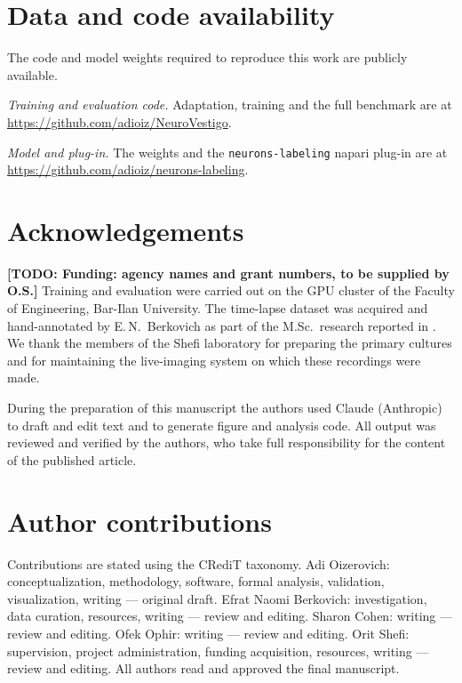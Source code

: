 \documentclass[11pt,a4paper]{article}
\newcommand{\todo}[1]{\textcolor{red!80!black}{\textbf{[TODO: #1]}}}
\begin{document}
\section*{Data and code availability}

The code and model weights required to reproduce this work are publicly
available.

\emph{Training and evaluation code.} Adaptation, training and the full benchmark are at
\url{https://github.com/adioiz/NeuroVestigo}.

\emph{Model and plug-in.} The weights and the \texttt{neurons-labeling} napari plug-in are at
\url{https://github.com/adioiz/neurons-labeling}.

\section*{Acknowledgements}
\todo{Funding: agency names and grant numbers, to be supplied by O.S.}
Training and evaluation were carried out on the GPU cluster of the Faculty
of Engineering, Bar-Ilan University. The time-lapse dataset was acquired and
hand-annotated by E.\,N.~Berkovich as part of the M.Sc.\ research reported in
\cite{berkovich2025neurite}. We thank the members of the Shefi laboratory for
preparing the primary cultures and for maintaining the live-imaging system on
which these recordings were made.

During the preparation of this manuscript the authors used Claude (Anthropic)
to draft and edit text and to generate figure and analysis code. All output
was reviewed and verified by the authors, who take full responsibility for
the content of the published article.

\section*{Author contributions}
\begin{sloppypar}
Contributions are stated using the CRediT taxonomy. Adi Oizerovich:
conceptualization, methodology, software, formal analysis, validation,
visualization, writing --- original draft. Efrat Naomi Berkovich:
investigation, data curation, resources, writing --- review and editing.
Sharon Cohen: writing --- review and editing. Ofek Ophir: writing --- review
and editing. Orit Shefi: supervision, project administration, funding
acquisition, resources, writing --- review and editing. All authors read and
approved the final manuscript.
\end{sloppypar}
\end{document}
